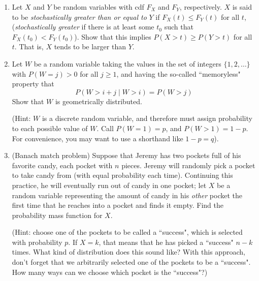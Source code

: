 \documentclass[10pt,twoside]{article}\usepackage[]{graphicx}\usepackage[dvipsnames,svgnames,table]{xcolor}
\begin{document}
\begin{enumerate}
    \item Let $X$ and $Y$ be random variables with cdf $F_X$ and $F_Y$, respectively. $X$ is said to be \emph{stochastically greater than or equal to} $Y$ if $F_X(t) \leq F_Y(t)$ for all $t$, (\emph{stochastically greater} if there is at least some $t_0$ such that $F_X(t_0) < F_Y(t_0)$). Show that this implies $P(X > t) \geq P(Y > t)$ for all $t$. That is, $X$ tends to be larger than $Y$. 
    
    \item Let $W$ be a random variable taking the values in the set of integers $\{1, 2, \ldots\}$ with $P(W = j) > 0$ for all $j\geq 1$, and having the so-called ``memoryless" property that 
    $$
    P(W > i+j\mid W > i) = P(W > j)
    $$
    Show that $W$ is geometrically distributed.
    
    (Hint: $W$ is a discrete random variable, and therefore must assign probability to each possible value of $W$. Call $P(W = 1) = p$, and $P(W > 1) = 1-p$. For convenience, you may want to use a shorthand like $1 - p = q$). 
    
    \item (Banach match problem) Suppose that Jeremy has two pockets full of his favorite candy, each pocket with $n$ pieces. Jeremy will randomly pick a pocket to take candy from (with equal probability each time). Continuing this practice, he will eventually run out of candy in one pocket; let $X$ be a random variable representing the amount of candy in his \emph{other} pocket the first time that he reaches into a pocket and finds it empty. Find the probability mass function for $X$.
    
    (Hint: choose one of the pockets to be called a ``success", which is selected with probability $p$. If $X = k$, that means that he has picked a ``success" $n - k$ times. What kind of distribution does this sound like? With this approach, don't forget that we arbitrarily selected one of the pockets to be a ``success". How many ways can we choose which pocket is the ``success"?)

\end{enumerate}
\end{document}
